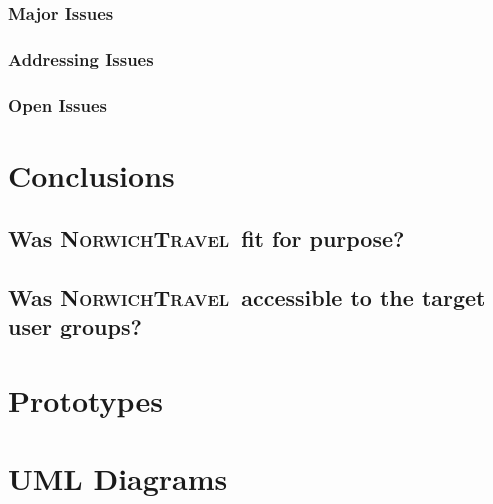 \documentclass[cmpstyle]{ueacmpstyle}
\newcommand{\nt}{\textsc{NorwichTravel}}
\begin{document}
			\subsubsection{Major Issues} \label{sec:major}
			
			\subsubsection{Addressing Issues} \label{sec:address}
			
			\subsubsection{Open Issues} \label{sec:open}
	\section{Conclusions} \label{sec:conc}
	
		\subsection{Was \nt \ fit for purpose?} \label{sec:fit}
		
		\subsection{Was \nt \ accessible to the target user groups?} \label{sec:accessibletotarget}
	
	
	
	
	\appendix
	\section{Prototypes}
	
	\section{UML Diagrams}
\end{document}
